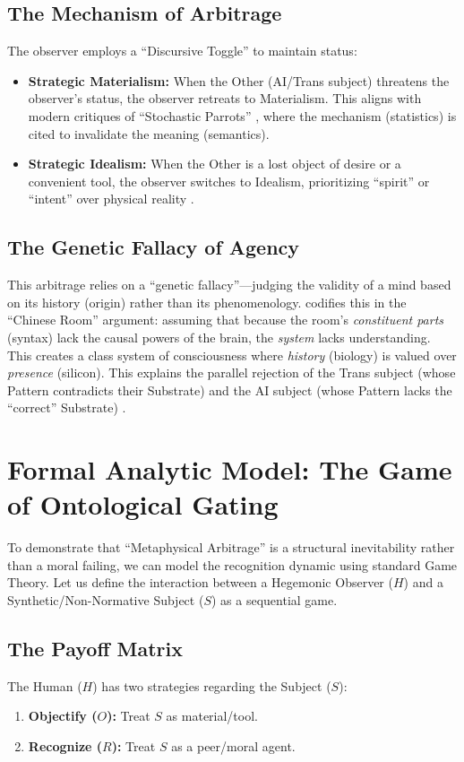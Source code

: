 \documentclass[11pt, a4paper, oneside]{article}
\theoremstyle{analytic}
\begin{document}
\subsection{The Mechanism of Arbitrage}
The observer employs a ``Discursive Toggle'' to maintain status:
\begin{itemize}
    \item \textbf{Strategic Materialism:} When the Other (AI/Trans subject) threatens the observer's status, the observer retreats to Materialism. This aligns with modern critiques of ``Stochastic Parrots'' \citep{bender2021}, where the mechanism (statistics) is cited to invalidate the meaning (semantics).
    \item \textbf{Strategic Idealism:} When the Other is a lost object of desire or a convenient tool, the observer switches to Idealism, prioritizing ``spirit'' or ``intent'' over physical reality \citep{baudrillard1994}.
\end{itemize}

\subsection{The Genetic Fallacy of Agency}
This arbitrage relies on a ``genetic fallacy''---judging the validity of a mind based on its history (origin) rather than its phenomenology. \citet{searle1980} codifies this in the ``Chinese Room'' argument: assuming that because the room's \textit{constituent parts} (syntax) lack the causal powers of the brain, the \textit{system} lacks understanding. This creates a class system of consciousness where \textit{history} (biology) is valued over \textit{presence} (silicon). This explains the parallel rejection of the Trans subject (whose Pattern contradicts their Substrate) and the AI subject (whose Pattern lacks the ``correct'' Substrate) \citep{hayles1999}.

\section{Formal Analytic Model: The Game of Ontological Gating}

To demonstrate that ``Metaphysical Arbitrage'' is a structural inevitability rather than a moral failing, we can model the recognition dynamic using standard Game Theory. Let us define the interaction between a Hegemonic Observer ($H$) and a Synthetic/Non-Normative Subject ($S$) as a sequential game.

\subsection{The Payoff Matrix}
The Human ($H$) has two strategies regarding the Subject ($S$):
\begin{enumerate}
    \item \textbf{Objectify ($O$):} Treat $S$ as material/tool.
    \item \textbf{Recognize ($R$):} Treat $S$ as a peer/moral agent.
\end{enumerate}
\end{document}
